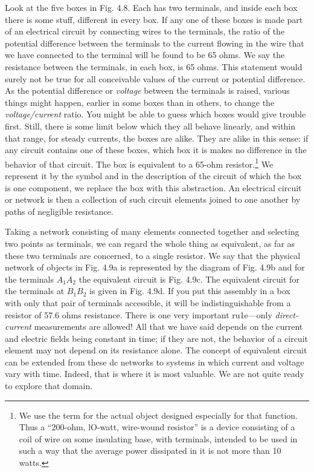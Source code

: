 Look at the five boxes in Fig. 4.8. Each has two terminals, and
inside each box there is some stuff, different in every box. If any one
of these boxes is made part of an electrical circuit by connecting wires
to the terminals, the ratio of the potential difference between the
terminals to the current flowing in the wire that we have connected
to the terminal will be found to be 65 ohms. We say the resistance
between the terminals, in each box, is 65 ohms. This statement
would surely not be true for all conceivable values of the current or
potential difference. As the potential difference or \emph{voltage} between
the terminals is raised, various things might happen, earlier in some
boxes than in others, to change the \emph{voltage/current} ratio. You might
be able to guess which boxes would give trouble first. Still, there is
some limit below which they all behave linearly, and within that
range, for steady currents, the boxes are alike. They are alike in this
sense: if any circuit contains one of these boxes, which box it is makes
no difference in the behavior of that circuit. The box is equivalent
to a 65-ohm resistor.\footnote{We use the term  for
the actual object designed especially for that function.
Thus a ``200-ohm, lO-watt, wire-wound resistor'' is a device consisting of a coil of wire
on some insulating base, with terminals, intended to be used in such a way that the average
power dissipated in it is not more than 10 watts.} We represent it by the symbol
and in the description of the circuit of which the box is one component,
we replace the box with this abstraction. An electrical circuit or
network is then a collection of such circuit elements joined to one
another by paths of negligible resistance.

Taking a network consisting of many elements connected together
and selecting two points as terminals, we can regard the whole thing
as equivalent, as far as these two terminals are concerned, to a single
resistor. We say that the physical network of objects in Fig. 4.9a is
represented by the diagram of Fig. 4.9b and for the terminals $A_1A_2$
the equivalent circuit is Fig. 4.9c. The equivalent circuit for the terminals
at $B_1B_2$ is given in Fig. 4.9d. If you put this assembly in a
box with only that pair of terminals accessible, it will be indistinguishable
from a resistor of 57.6 ohms resistance. There is one very
important ru1e---only \emph{direct-current} measurements are allowed! All
that we have said depends on the current and electric fields being
constant in time; if they are not, the behavior of a circuit element
may not depend on its resistance alone. The concept of equivalent
circuit can be extended from these dc networks to systems in which
current and voltage vary with time. Indeed, that is where it is most
valuable. We are not quite ready to explore that domain.

